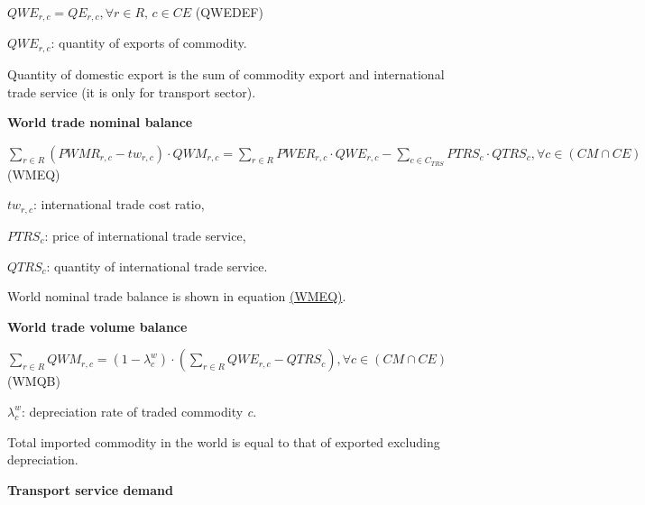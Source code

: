 \documentclass[10pt,a4paper,titlepage,dvipdfmx]{book}
\begin{document}
\begin{center}$QWE_{r,c}=QE_{r,c},\forall r\in R,\,c\in CE$ (QWEDEF)
\end{center}

\begin{flushleft} $QWE_{r,c}$: quantity of exports of commodity. \end{flushleft}

Quantity of domestic export is the sum of commodity export and international trade service (it is only for transport sector). 

\begin{flushleft}\textbf{World trade nominal balance }\end{flushleft}


\begin{center}$\sum _{r\in R}\left(PWMR_{r,c}-tw_{r,c}\right)\cdot QWM_{r,c}=\sum _{r\in R}PWER_{r,c}\cdot QWE_{r,c}-\sum _{c\in {C_{TRS}}}PTRS_{c}\cdot QTRS_{c},\forall c\in \left(CM\cap CE\right)$ (WMEQ)\label{ref-0039}
\end{center}

\begin{flushleft}
$tw_{r,c}$: international trade cost ratio,

$PTRS_{c}$: price of international trade service,

$QTRS_{c}$: quantity of international trade service.
\end{flushleft}

World nominal trade balance is shown in equation {\hyperref[ref-0039]{(WMEQ)}}. 

\begin{flushleft}\textbf{World trade volume balance}\end{flushleft}


\begin{center}$\sum _{r\in R}QWM_{r,c}=\left(1-\lambda _{c}^{w}\right)\cdot \left(\sum _{r\in R}QWE_{r,c}-QTRS_{c}\right),\forall c\in \left(CM\cap CE\right)$ (WMQB)
\end{center}

\begin{flushleft} $\lambda _{c}^{w}$: depreciation rate of traded commodity \textit{c}. \end{flushleft}

Total imported commodity in the world is equal to that of exported excluding depreciation. 

\begin{flushleft}\textbf{Transport service demand}\end{flushleft}
\end{document}

